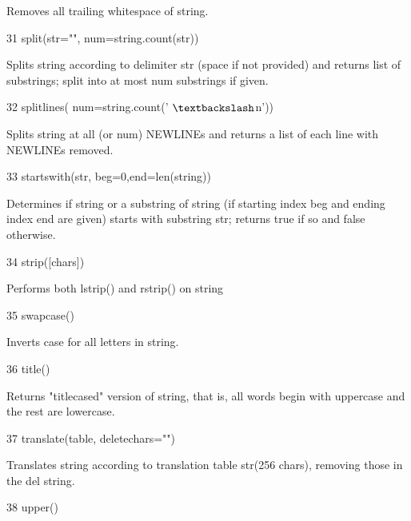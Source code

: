 \vspace{12pt}
Removes all trailing whitespace of string. \par
31 \hspace*{0.5in} split(str="", num=string.count(str)) \par
\vspace{12pt}
Splits string according to delimiter str (space if not provided) and returns list of substrings; split into at most num substrings if given. \par
32 \hspace*{0.5in} splitlines( num=string.count(' $  \textbackslash  $n')) \par
\vspace{12pt}
Splits string at all (or num) NEWLINEs and returns a list of each line with NEWLINEs removed. \par
33 \hspace*{0.5in} startswith(str, beg=0,end=len(string)) \par
\vspace{12pt}
Determines if string or a substring of string (if starting index beg and ending index end are given) starts with substring str; returns true if so and false otherwise. \par
34 \hspace*{0.5in} strip([chars]) \par
\vspace{12pt}
Performs both lstrip() and rstrip() on string \par
35 \hspace*{0.5in} swapcase() \par
\vspace{12pt}
Inverts case for all letters in string. \par
36 \hspace*{0.5in} title() \par
\vspace{12pt}
Returns "titlecased" version of string, that is, all words begin with uppercase and the rest are lowercase. \par
37 \hspace*{0.5in} translate(table, deletechars="") \par
\vspace{12pt}
Translates string according to translation table str(256 chars), removing those in the del string. \par
38 \hspace*{0.5in} upper() \par
\vspace{12pt}
